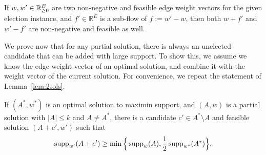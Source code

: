 \begin{lemma}\label{lem:subflow}
If $w, w'\in\mathbb{R}_{\geq 0}^E$ are two non-negative and feasible edge weight vectors for the given election instance, and $f'\in\mathbb{R}^E$ is a sub-flow of $f:=w'-w$, then both $w+f'$ and $w'-f'$ are non-negative and feasible as well.
\end{lemma}

We prove now that for any partial solution, there is always an unelected candidate that can be added with large support. To show this, we assume we know the edge weight vector of an optimal solution, and combine it with the weight vector of the current solution. For convenience, we repeat the statement of Lemma~\ref{lem:2sols}.

\begin{lemma*}
If $(A^*, w^*)$ is an optimal solution to maximin support, and $(A,w)$ is a partial solution with $|A|\leq k$ and $A\neq A^*$, there is a candidate $c'\in A^*\setminus A$ and feasible solution $(A+c', w')$ such that 
$$\operatorname{supp}_{w'}(A+c')\geq \min\Big\{\operatorname{supp}_w(A), \frac{1}{2} \operatorname{supp}_{w^*}(A^*)\Big\}.$$
\end{lemma*}

